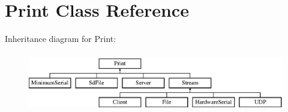 \hypertarget{class_print}{\section{Print Class Reference}
\label{class_print}
}
Inheritance diagram for Print\-:\begin{figure}[H]
\begin{center}
\leavevmode
\includegraphics[height=2.568807cm]{class_print}
\end{center}
\end{figure}
